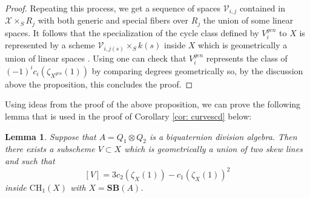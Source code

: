 \documentclass[12pt]{amsart}
\newtheorem{lem}[thm]{Lemma}
\theoremstyle{definition}
\newcommand{\CH}{\mathrm{CH}}
\newcommand{\SB}{\mathbf{SB}}
\begin{document}
\begin{proof}
Repeating this process, we get a sequence of spaces $\mathcal{V}_{i,j}$ contained in $\mathcal{X}\times_S R_j$ with both generic and special fibers over $R_j$ the union of some linear spaces. It follows that the specialization of the cycle class defined by $V_i^{gen}$ to $X$ is represented by a scheme $\mathcal{V}_{i,j(s)}\times_S k(s)$ inside $X$ which is geometrically a union of linear spaces \cite[\S20.3]{MR1644323}. Using \cite[Proposition 3.2]{MR3590349} one can check that $V_i^{gen}$ represents the class of $(-1)^ic_i(\zeta_{X^{gen}}(1))$ by comparing degrees geometrically so, by the discussion above the proposition, this concludes the proof. \end{proof}

Using ideas from the proof of the above proposition, we can prove the following lemma that is used in the proof of Corollary \ref{cor: curvescd} below:

\begin{lem}\label{lem: spec1}
Suppose that $A=Q_1\otimes Q_2$ is a biquaternion division algebra. Then there exists a subscheme $V\subset X$ which is geometrically a union of two skew lines and such that \[[V]=3c_2(\zeta_X(1))-c_1(\zeta_X(1))^2\] inside $\CH_1(X)$ with $X=\SB(A)$.
\end{lem}
\end{document}
